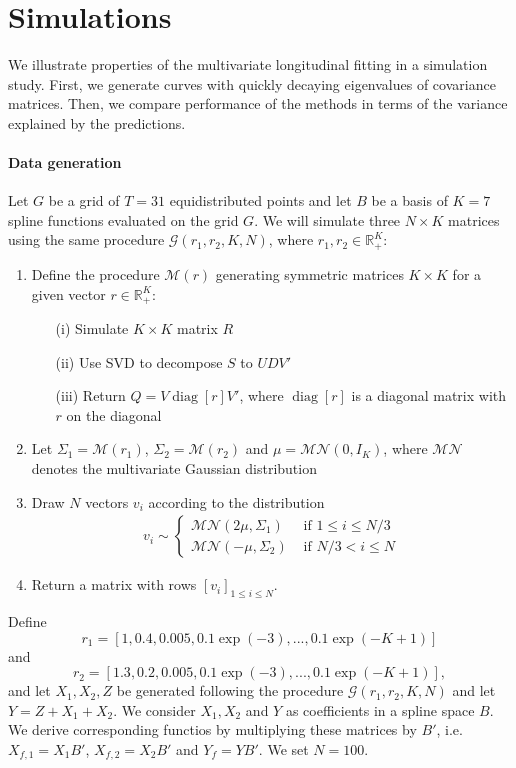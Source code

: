 \documentclass[preprint]{imsart}
\numberwithin{equation}{section}
\theoremstyle{plain}
\newcommand{\cMN}{\mathcal{MN}}
\newcommand{\cG}{\mathcal{G}}
\newcommand{\cM}{\mathcal{M}}
\newcommand{\R}{\mathbb{R}}
\DeclareMathOperator*{\diag}{diag}
\begin{document}
\section{Simulations}\label{s:simulation}

We illustrate properties of the multivariate longitudinal fitting in a simulation study. First, we generate curves with quickly decaying eigenvalues of covariance matrices. Then, we compare performance of the methods in terms of the variance explained by the predictions. %

\paragraph{Data generation} Let $G$ be a grid of $T = 31$ equidistributed points and let $B$ be a basis of $K = 7$ spline functions evaluated on the grid $G$. %
We will simulate three $N \times K$ matrices using the same procedure $\cG(r_1, r_2, K, N)$, where $r_1, r_2 \in \R_+^K$:
\begin{enumerate}
\item Define the procedure $\cM(r)$ generating symmetric matrices $K \times K$ for a given vector $r \in \R_+^K$:
  \begin{enumerate}
    \item[(i)] Simulate $K \times K$ matrix $R$
    \item[(ii)] Use SVD to decompose $S$ to $UDV'$
    \item[(iii)] Return $Q = V \diag[r] V' $, where $\diag[r]$ is a diagonal matrix with $r$ on the diagonal
  \end{enumerate}
\item Let $\Sigma_1 = \cM(r_1)$, $\Sigma_2 = \cM(r_2)$ and $\mu = \cMN(0, I_K)$, where $\cMN$ denotes the multivariate Gaussian distribution
\item Draw $N$ vectors $v_i$ according to the distribution
\begin{align*}
v_i \sim 
\begin{cases}
\cMN(2\mu, \Sigma_1) & \text{ if } 1 \leq i \leq N/3\\
\cMN(-\mu, \Sigma_2) & \text{ if } N/3 < i \leq N
\end{cases}
\end{align*}
\item Return a matrix with rows $[v_i]_{1 \leq i \leq N}$.
\end{enumerate}
Define \[ r_1 = [1, 0.4, 0.005, 0.1 \exp(-3), ..., 0.1 \exp(-K+1)] \]  and \[ r_2 = [1.3, 0.2, 0.005, 0.1 \exp(-3), ..., 0.1 \exp(-K+1)],\]
and let $X_1,X_2,Z$ be generated following the procedure $\cG(r_1,r_2,K,N)$ and let $Y = Z + X_1 + X_2$. We consider $X_1,X_2$ and $Y$ as coefficients in a spline space $B$. We derive corresponding functios by multiplying these matrices by $B'$, i.e. $X_{f,1} = X_1B'$, $X_{f,2} = X_2B'$ and $Y_f = YB'$. We set $N=100$.
\end{document}
